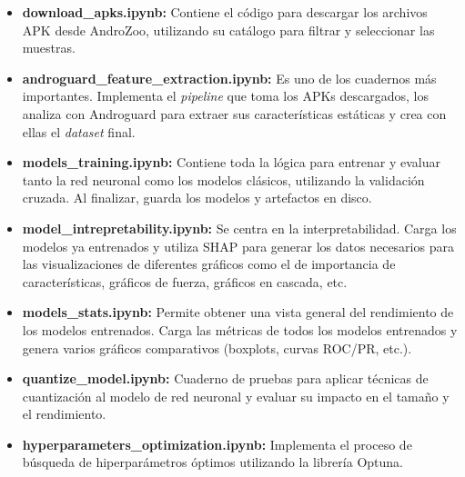 \begin{itemize}
	\item \textbf{download\_apks.ipynb:} Contiene el código para descargar los archivos APK desde AndroZoo, utilizando su catálogo para filtrar y seleccionar las muestras.
	
	\item \textbf{androguard\_feature\_extraction.ipynb:} Es uno de los cuadernos más importantes. Implementa el \textit{pipeline} que toma los APKs descargados, los analiza con Androguard para extraer sus características estáticas y crea con ellas el \textit{dataset} final.
	
	\item \textbf{models\_training.ipynb:} Contiene toda la lógica para entrenar y evaluar tanto la red neuronal como los modelos clásicos, utilizando la validación cruzada. Al finalizar, guarda los modelos y artefactos en disco.
	
	\item \textbf{model\_intrepretability.ipynb:} Se centra en la interpretabilidad. Carga los modelos ya entrenados y utiliza SHAP para generar los datos necesarios para las visualizaciones de diferentes gráficos como el de importancia de características, gráficos de fuerza, gráficos en cascada, etc.
	
	\item \textbf{models\_stats.ipynb:} Permite obtener una vista general del rendimiento de los modelos entrenados. Carga las métricas de todos los modelos entrenados y genera varios gráficos comparativos (boxplots, curvas ROC/PR, etc.).
	
	\item \textbf{quantize\_model.ipynb:} Cuaderno de pruebas para aplicar técnicas de cuantización al modelo de red neuronal y evaluar su impacto en el tamaño y el rendimiento.
	
	\item \textbf{hyperparameters\_optimization.ipynb:} Implementa el proceso de búsqueda de hiperparámetros óptimos utilizando la librería Optuna.
\end{itemize}

